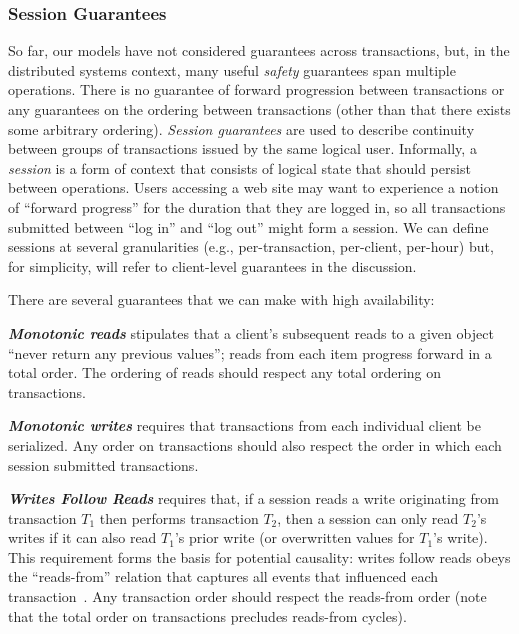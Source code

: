 \subsubsection{Session Guarantees}

So far, our models have not considered guarantees across transactions,
but, in the distributed systems context, many useful \textit{safety}
guarantees span multiple operations. There is no guarantee of forward
progression between transactions or any guarantees on the ordering
between transactions (other than that there exists some arbitrary
ordering). \textit{Session guarantees} are used to describe continuity
between groups of transactions issued by the same logical
user. Informally, a \textit{session} is a form of context that
consists of logical state that should persist between
operations. Users accessing a web site may want to experience a notion
of ``forward progress'' for the duration that they are logged in, so
all transactions submitted between ``log in'' and ``log out'' might
form a session. We can define sessions at several granularities (e.g.,
per-transaction, per-client, per-hour) but, for simplicity, will refer
to client-level guarantees in the discussion.

There are several guarantees that we can make with high availability:

\vspace{.25em}\noindent\textit{\textbf{Monotonic reads}} stipulates
that a client's subsequent reads to a given object ``never return any
previous values''; reads from each item progress forward in a total
order. The ordering of reads should respect any total ordering on
transactions.

\vspace{.25em}\noindent\textit{\textbf{Monotonic writes}} requires
that transactions from each individual client be serialized. Any order
on transactions should also respect the order in which each session
submitted transactions.

\vspace{.25em}\noindent\textit{\textbf{Writes Follow Reads}} requires
that, if a session reads a write originating from transaction $T_1$
then performs transaction $T_2$, then a session can only read $T_2$'s
writes if it can also read $T_1$'s prior write (or overwritten values
for $T_1$'s write). This requirement forms the basis for potential
causality: writes follow reads obeys the ``reads-from'' relation that
captures all events that influenced each
transaction~\cite{causalmemory}. Any transaction order should respect
the reads-from order (note that the total order on transactions
precludes reads-from cycles).

